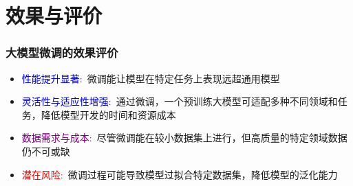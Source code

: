 \section{效果与评价}
\begin{frame}
    \frametitle{大模型微调的效果评价}
    \begin{itemize}
	    \item \textcolor{blue}{性能提升显著:}~微调能让模型在特定任务上表现远超通用模型\\
		{\fontsize{7.2pt}{6.2pt}\selectfont{在电商推荐、医疗诊断、金融服务、工业设计等案例中，相关模型的准确率、效率等性能指标显著提高}}
	\item \textcolor{blue}{灵活性与适应性增强:}~通过微调，一个预训练大模型可适配多种不同领域和任务，降低模型开发的时间和资源成本\\
		{\fontsize{7.2pt}{6.2pt}\selectfont{同一基础模型经微调后，有可能可同时适用于多个不同场景}}
	\item \textcolor{purple}{数据需求与成本:}~尽管微调能在较小数据集上进行，但高质量的特定领域数据仍不可或缺\\
		{\fontsize{7.2pt}{6.2pt}\selectfont{全模型微调计算成本高，部分层微调或基于特征提取的微调虽能降低成本，却也可能限制模型性能的提升幅度}}
	\item \textcolor{red}{潜在风险:}~微调过程可能导致模型过拟合特定数据集，降低模型的泛化能力\\
		{\fontsize{7.2pt}{6.2pt}\selectfont{不当的微调还可能放大数据中的偏差，引发公平性和安全性等各种问题}}
    \end{itemize}
\end{frame}

